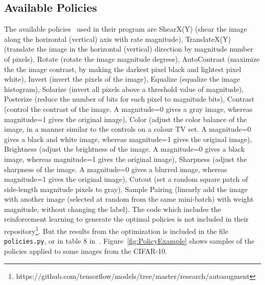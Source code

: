 \documentclass[10pt,twocolumn,letterpaper]{article}
\begin{document}
\subsection{Available Policies}
The available policies~\cite{Ekin} used in their program are ShearX(Y) (shear the image along the horizontal (vertical) axis with rate magnitude), TranslateX(Y) (translate the image in the horizontal (vertical) direction by magnitude number of pixels), Rotate (rotate the image magnitude degrees), AutoContrast (maximize the the image contrast, by making the darkest pixel black and lightest pixel white),  Invert (invert the pixels of the image), Equalize (equalize the image histogram), Solarize (invert all pixels above a threshold value of magnitude), Posterize (reduce the number of bits for each pixel to magnitude bits), Contrast (control the contrast of the image. A magnitude=0 gives a gray image, whereas magnitude=1 gives the original image), Color (adjust the color balance of the image, in a manner similar to the controls on a colour TV set. A magnitude=0 gives a black and white image, whereas magnitude=1 gives the original image), Brightness (adjust the brightness of the image. A magnitude=0 gives a black image, whereas magnitude=1 gives the original image), Sharpness (adjust the sharpness of the image. A magnitude=0 gives a blurred image, whereas magnitude=1 gives the original image), Cutout (set a random square patch of side-length magnitude pixels to gray), Sample Pairing (linearly add the image with another image (selected at random from the same mini-batch) with weight magnitude, without changing the label).
The code which includes the reinforcement learning to generate the optimal policies is not included in their repository\footnote{https://github.com/tensorflow/models/tree/master/research/autoaugment}. But the results from the optimization is included in the file \texttt{policies.py}, or in table 8 in~\cite{Ekin}. Figure~\ref{fig:PolicyExample} shows samples of the policies applied to some images from the CIFAR-10.
\end{document}
